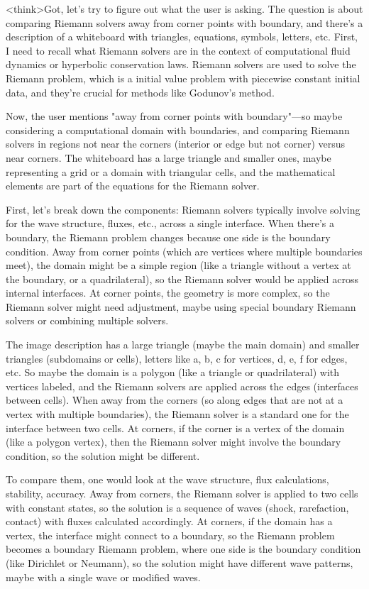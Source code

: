 <think>Got, let's try to figure out what the user is asking. The question is about comparing Riemann solvers away from corner points with boundary, and there's a description of a whiteboard with triangles, equations, symbols, letters, etc. First, I need to recall what Riemann solvers are in the context of computational fluid dynamics or hyperbolic conservation laws. Riemann solvers are used to solve the Riemann problem, which is a initial value problem with piecewise constant initial data, and they're crucial for methods like Godunov's method.

Now, the user mentions "away from corner points with boundary"—so maybe considering a computational domain with boundaries, and comparing Riemann solvers in regions not near the corners (interior or edge but not corner) versus near corners. The whiteboard has a large triangle and smaller ones, maybe representing a grid or a domain with triangular cells, and the mathematical elements are part of the equations for the Riemann solver.

First, let's break down the components: Riemann solvers typically involve solving for the wave structure, fluxes, etc., across a single interface. When there's a boundary, the Riemann problem changes because one side is the boundary condition. Away from corner points (which are vertices where multiple boundaries meet), the domain might be a simple region (like a triangle without a vertex at the boundary, or a quadrilateral), so the Riemann solver would be applied across internal interfaces. At corner points, the geometry is more complex, so the Riemann solver might need adjustment, maybe using special boundary Riemann solvers or combining multiple solvers.

The image description has a large triangle (maybe the main domain) and smaller triangles (subdomains or cells), letters like a, b, c for vertices, d, e, f for edges, etc. So maybe the domain is a polygon (like a triangle or quadrilateral) with vertices labeled, and the Riemann solvers are applied across the edges (interfaces between cells). When away from the corners (so along edges that are not at a vertex with multiple boundaries), the Riemann solver is a standard one for the interface between two cells. At corners, if the corner is a vertex of the domain (like a polygon vertex), then the Riemann solver might involve the boundary condition, so the solution might be different.

To compare them, one would look at the wave structure, flux calculations, stability, accuracy. Away from corners, the Riemann solver is applied to two cells with constant states, so the solution is a sequence of waves (shock, rarefaction, contact) with fluxes calculated accordingly. At corners, if the domain has a vertex, the interface might connect to a boundary, so the Riemann problem becomes a boundary Riemann problem, where one side is the boundary condition (like Dirichlet or Neumann), so the solution might have different wave patterns, maybe with a single wave or modified waves.

